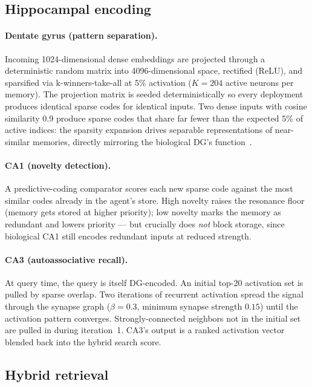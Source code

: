 \documentclass{article}
\begin{document}
\subsection{Hippocampal encoding}

\paragraph{Dentate gyrus (pattern separation).}
Incoming 1024-dimensional dense embeddings are projected through a
deterministic random matrix into 4096-dimensional space, rectified
(ReLU), and sparsified via k-winners-take-all at 5\% activation
($K = 204$ active neurons per memory). The projection matrix is seeded
deterministically so every deployment produces identical sparse codes
for identical inputs. Two dense inputs with cosine similarity 0.9
produce sparse codes that share far fewer than the expected 5\% of
active indices: the sparsity expansion drives separable representations
of near-similar memories, directly mirroring the biological DG's
function~\cite{rolls2013}.

\paragraph{CA1 (novelty detection).}
A predictive-coding comparator scores each new sparse code against the
most similar codes already in the agent's store. High novelty raises
the resonance floor (memory gets stored at higher priority); low
novelty marks the memory as redundant and lowers priority --- but
crucially does \emph{not} block storage, since biological CA1 still
encodes redundant inputs at reduced strength.

\paragraph{CA3 (autoassociative recall).}
At query time, the query is itself DG-encoded. An initial top-20
activation set is pulled by sparse overlap. Two iterations of recurrent
activation spread the signal through the synapse graph
($\beta = 0.3$, minimum synapse strength $0.15$) until the activation
pattern converges. Strongly-connected neighbors not in the initial set
are pulled in during iteration~1. CA3's output is a ranked activation
vector blended back into the hybrid search score.

\subsection{Hybrid retrieval}
\end{document}

